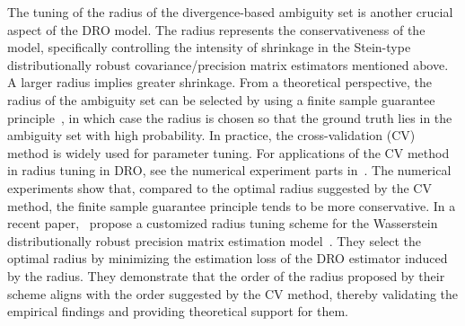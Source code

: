 \documentclass[11pt]{article}
\begin{document}
The tuning of the radius of the divergence-based ambiguity set is another crucial aspect of the DRO model. The radius represents the conservativeness of the model, specifically controlling the intensity of shrinkage in the Stein-type distributionally robust covariance/precision matrix estimators mentioned above. A larger radius implies greater shrinkage. From a theoretical perspective, the radius of the ambiguity set can be selected by using a finite sample guarantee principle~\citep{ref:mohajerin2018data,ref:yue2024geometric}, in which case the radius is chosen so that the ground truth lies in the ambiguity set with high probability. In practice, the cross-validation (CV) method is widely used for parameter tuning. For applications of the CV method in radius tuning in DRO, see the numerical experiment parts in~\cite{ref:mohajerin2018data, ref:yue2024geometric,ref:gao2023distributionally,ref:nguyen2022distributionally}. The numerical experiments show that, compared to the optimal radius suggested by the CV method, the finite sample guarantee principle tends to be more conservative.
In a recent paper,~\cite{ref:BLANCHET2019618} propose a customized radius tuning scheme for the Wasserstein distributionally robust precision matrix estimation model~\citep{ref:nguyen2022distributionally}. They select the optimal radius by minimizing the estimation loss of the DRO estimator induced by the radius. They demonstrate that the order of the radius proposed by their scheme aligns with the order suggested by the CV method, thereby validating the empirical findings and providing theoretical support for them.
\end{document}
